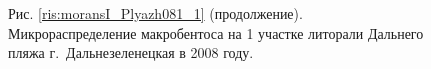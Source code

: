 \documentclass[12pt, a4paper]{disser}
\begin{document}
\begin{figure}[h]
	
%





%
%



	\begin{center}
	Рис. \ref{ris:moransI_Plyazh081_1} (продолжение). Микрораспределение макробентоса на 1 участке литорали Дальнего пляжа г.~Дальнезеленецкая в 2008 году.
	\end{center}
\end{figure}
\end{document}
